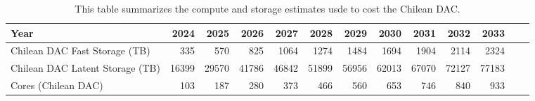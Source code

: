 \tiny \begin{longtable} { |p{}  |r  |r  |r  |r  |r  |r  |r  |r  |r  |r  |r  |r |} 
\caption{This table summarizes the compute and storage estimates usde to cost the Chilean DAC. \label{tab:chileDac}}\\ 
\hline 
\textbf{Year}&\textbf{2024}&\textbf{2025}&\textbf{2026}&\textbf{2027}&\textbf{2028}&\textbf{2029}&\textbf{2030}&\textbf{2031}&\textbf{2032}&\textbf{2033}& \\ \hline
{Chilean DAC Fast Storage (TB)}&{335}&{570}&{825}&{1064}&{1274}&{1484}&{1694}&{1904}&{2114}&{2324}&{ } \\ \hline
{Chilean DAC Latent Storage (TB)}&{16399}&{29570}&{41786}&{46842}&{51899}&{56956}&{62013}&{67070}&{72127}&{77183}& \\ \hline
{Cores (Chilean DAC)}&{103}&{187}&{280}&{373}&{466}&{560}&{653}&{746}&{840}&{933}& \\ \hline
\end{longtable} \normalsize
